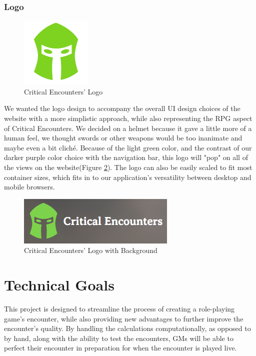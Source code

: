 \documentclass[12pt,a4paper]{report}
\begin{document}
	\subsection {Logo}
	\begin{figure}[H]
		\centering
		\includegraphics[scale=.5]{logo-large}
		\caption{Critical Encounters' Logo}
		\label{fig: Critical Encounters' Logo}
	\end{figure}
	We wanted the logo design to accompany the overall UI design choices of the website with a more simplistic approach, while also representing the RPG aspect of Critical Encounters. We decided on a helmet because it gave a little more of a human feel, we thought swords or other weapons would be too inanimate and maybe even a bit cliché. Because of the light green color, and the contrast of our darker purple color choice with the navigation bar, this logo will "pop" on all of the views on the website(Figure \ref{fig: Critical Encounters' Logo with Background}). The logo can also be easily scaled to fit most container sizes, which fits in to our application's versatility between desktop and mobile browsers.
	\bigskip
	\begin{figure}[H]
		\centering
		\includegraphics[scale=1]{navbar-logo}
		\caption{Critical Encounters' Logo with Background}
		\label{fig: Critical Encounters' Logo with Background}
	\end{figure}
\newpage
\chapter*{Technical Goals}
This project is designed to streamline the process of creating a role-playing game's encounter, while also providing new advantages to further improve the encounter's quality. By handling the calculations computationally, as opposed to by hand, along with the ability to test the encounters, GMs will be able to perfect their encounter in preparation for when the encounter is played live.
\end{document}
